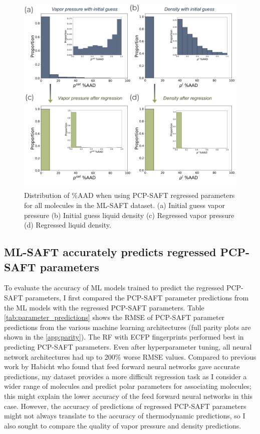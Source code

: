\begin{figure}
    \centering
    \includegraphics[width=\textwidth]{gfx/Chapter08/regression_errors.png}
    \caption{Distribution of \%AAD  when using PCP-SAFT regressed parameters for all molecules in the ML-SAFT dataset. (a) Initial guess vapor pressure (b) Initial guess liquid density (c) Regressed vapor pressure (d) Regressed liquid density.}
    \label{fig:regression_errors}
\end{figure}

\subsection{ML-SAFT accurately predicts regressed PCP-SAFT parameters}

To evaluate the accuracy of ML models trained to predict the regressed PCP-SAFT parameters, I first compared the PCP-SAFT parameter predictions from the ML models with the regressed PCP-SAFT parameters. Table \ref{tab:parameter_predictions} shows the RMSE of PCP-SAFT parameter predictions from the various machine learning architectures (full parity plots are shown in the \ref{app:parity}). The RF with ECFP fingerprints performed best in predicting PCP-SAFT parameters. Even after hyperparameter tuning, all neural network architectures had up to 200\% worse RMSE values. Compared to previous work by Habicht who found that feed forward neural networks gave accurate predictions, my dataset provides a more difficult regression task as I consider a wider range of molecules and predict polar parameters for associating molecules; this might explain the lower accuracy of the feed forward neural networks in this case. However, the accuracy of predictions of regressed PCP-SAFT parameters might not always translate to the accuracy of thermodynamic predictions, so I also sought to compare the quality of vapor pressure and density predictions.

